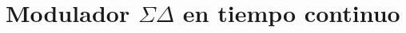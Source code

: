 \documentclass[a4paper,conference]{IEEEtran}
\begin{document}
%
%


%



\section{Modulador $\Sigma\Delta$ en tiempo continuo}
\end{document}
